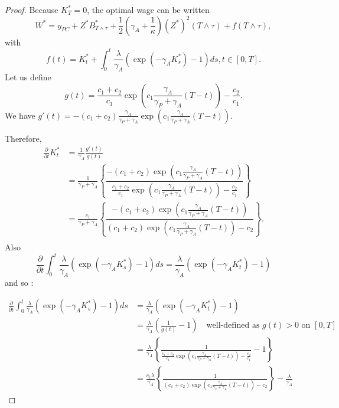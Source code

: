 \documentclass[numbook, envcountsect, envcountsame, envcountreset, runningheads, smallextended]{article}
\begin{document}
\begin{proof}
Because $K^*_T=0$, the optimal wage can be written
$$
W^*=y_{PC}+Z^*B^*_{T\wedge \tau}+\frac{1}{2}\left(\gamma_A+\frac{1}{\kappa}\right)(Z^*)^2 (T\wedge \tau )+f(T\wedge \tau),
$$
with 
$$
f(t) = K^*_t + \int_0^t \frac{\lambda}{\gamma_A}\left(\exp(-\gamma_A K^*_s) - 1 \right) ds,  t \in [0,T].
$$
Let us define
$$g(t) = \frac{c_1+c_2}{c_1}\exp\left(c_1 \frac{\gamma_A}{\gamma_P+\gamma_A}(T-t)\right) - \frac{c_2}{c_1}.$$
We have
$ g'(t) =  -(c_1+c_2)\frac{\gamma_A}{\gamma_P + \gamma_A}\exp\left(c_1 \frac{\gamma_A}{\gamma_P+\gamma_A}(T-t)\right) .$

Therefore, 
\begin{align*}
\frac{\partial }{\partial t} K^*_t &= \frac{1}{\gamma_A} \frac{g'(t)}{g(t)}\\
&= \frac{1}{\gamma_P + \gamma_A} \left\{ \dfrac{-(c_1+c_2)\exp\left(c_1 \frac{\gamma_A}{\gamma_P+\gamma_A}(T-t)\right) }{ \frac{c_1+c_2}{c_1}\exp\left(c_1 \frac{\gamma_A}{\gamma_P+\gamma_A}(T-t)\right) - \frac{c_2}{c_1}} \right\} \\
&= \frac{c_1}{\gamma_P + \gamma_A} \left\{ \dfrac{-(c_1+c_2)\exp\left(c_1 \frac{\gamma_A}{\gamma_P+\gamma_A}(T-t)\right) }{  (c_1+c_2)\exp\left(c_1 \frac{\gamma_A}{\gamma_P+\gamma_A}(T-t)\right) - c_2} \right\}.\\
\end{align*}
Also
$$ \frac{\partial}{\partial t}\int_0^t \frac{\lambda}{\gamma_A}\left(\exp(-\gamma_A K^*_s) - 1 \right) ds =  \frac{\lambda}{\gamma_A}\left(\exp(-\gamma_A K^*_t) - 1 \right)$$
and so : 

\begin{align*}
 \frac{\partial}{\partial t}\int_0^t \frac{\lambda}{\gamma_A}\left(\exp(-\gamma_A K^*_s) - 1 \right) ds
 &=  \frac{\lambda}{\gamma_A}\left(\exp(-\gamma_A K^*_t) - 1 \right) \\
  &=  \frac{\lambda}{\gamma_A}\left( \frac{1}{g(t)} - 1 \right)  \quad \text{well-defined as $g(t) > 0$ on $[0,T]$}\\
&=  \frac{\lambda}{\gamma_A} \left\{ \frac{1}{ \frac{c_1+c_2}{c_1}\exp\left(c_1 \frac{\gamma_A}{\gamma_P+\gamma_A}(T-t)\right) - \frac{c_2}{c_1}} - 1\right\}\\
 &=  \frac{c_1 \lambda}{\gamma_A} \left\{ \frac{1}{ (c_1 + c_2)\exp\left(c_1 \frac{\gamma_A}{\gamma_P+\gamma_A}(T-t)\right) - c_2 } \right\} - \frac{\lambda}{\gamma_A}
\end{align*}
 

\end{proof}
\end{document}
